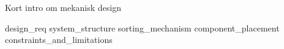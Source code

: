 
Kort intro om mekanisk design

{design_req}
{system_structure}
{sorting_mechanism}
{component_placement}
{constraints_and_limitations}